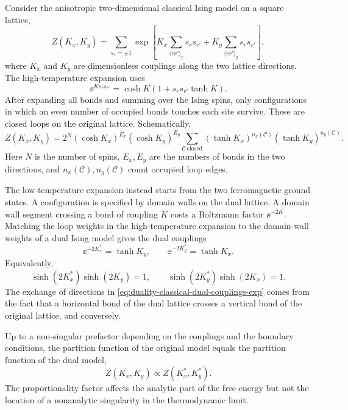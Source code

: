 Consider the anisotropic two-dimensional classical Ising model on a square
lattice,
\begin{equation}
\label{eq:duality-2d-classical-ising}
    Z(K_x,K_y)
    =
    \sum_{s_{r}=\pm1}
    \exp\left[
        K_x\sum_{\langle r r'\rangle_x}s_rs_{r'}
        +
        K_y\sum_{\langle r r'\rangle_y}s_rs_{r'}
    \right],
\end{equation}
where $K_x$ and $K_y$ are dimensionless couplings along the two lattice
directions.  The high-temperature expansion uses
\begin{equation}
\label{eq:duality-high-temp-bond}
    \ee^{K s_rs_{r'}}
    =
    \cosh K\left(1+s_rs_{r'}\tanh K\right).
\end{equation}
After expanding all bonds and summing over the Ising spins, only configurations
in which an even number of occupied bonds touches each site survive.  These are
closed loops on the original lattice.  Schematically,
\begin{equation}
\label{eq:duality-high-temp-loops}
    Z(K_x,K_y)
    =
    2^N(\cosh K_x)^{E_x}(\cosh K_y)^{E_y}
    \sum_{\mathcal{C}\,\text{closed}}
    (\tanh K_x)^{n_x(\mathcal{C})}
    (\tanh K_y)^{n_y(\mathcal{C})}.
\end{equation}
Here $N$ is the number of spins, $E_x,E_y$ are the numbers of bonds in the two
directions, and $n_x(\mathcal{C}),n_y(\mathcal{C})$ count occupied loop edges.

The low-temperature expansion instead starts from the two ferromagnetic ground
states.  A configuration is specified by domain walls on the dual lattice.  A
domain wall segment crossing a bond of coupling $K$ costs a Boltzmann factor
$\ee^{-2K}$.  Matching the loop weights in the high-temperature expansion to the
domain-wall weights of a dual Ising model gives the dual couplings
\begin{equation}
\label{eq:duality-classical-dual-couplings-exp}
    \ee^{-2K_x^*}=\tanh K_y,
    \qquad
    \ee^{-2K_y^*}=\tanh K_x .
\end{equation}
Equivalently,
\begin{equation}
\label{eq:duality-classical-dual-couplings-sinh}
    \sinh(2K_x^*)\sinh(2K_y)=1,
    \qquad
    \sinh(2K_y^*)\sinh(2K_x)=1 .
\end{equation}
The exchange of directions in \cref{eq:duality-classical-dual-couplings-exp}
comes from the fact that a horizontal bond of the dual lattice crosses a vertical
bond of the original lattice, and conversely.

Up to a non-singular prefactor depending on the couplings and the boundary
conditions, the partition function of the original model equals the partition
function of the dual model,
\begin{equation}
\label{eq:duality-classical-partition-map}
    Z(K_x,K_y)
    \propto
    Z(K_x^*,K_y^*) .
\end{equation}
The proportionality factor affects the analytic part of the free energy but not
the location of a nonanalytic singularity in the thermodynamic limit.

